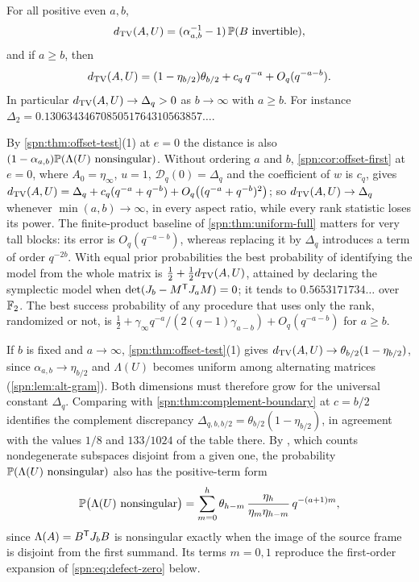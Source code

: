 \begin{theorem}\label{spn:thm:uniform-full}
For all positive even $a,b$,
\[
 d_{\mathrm{TV}}(A,U)=(\alpha_{a,b}^{-1}-1)\,\mathbb{P}(B\text{ invertible}),
\]
and if $a\ge b$, then
\[
 d_{\mathrm{TV}}(A,U)=(1-\eta_{b/2})\theta_{b/2}+c_q\,q^{-a}+O_q(q^{-a-b}).
\]
In particular $d_{\mathrm{TV}}(A,U)\to\Delta_q>0$ as $b\to\infty$ with $a\ge b$. For instance
$\Delta_2=0.1306343467085051764310563857\ldots$.
\end{theorem}

By \cref{spn:thm:offset-test}(1) at $e=0$ the distance is also
$(1-\alpha_{a,b})\mathbb{P}(\Lambda(U)\text{ nonsingular})$. Without ordering $a$ and $b$,
\cref{spn:cor:offset-first} at $e=0$, where $A_0=\eta_\infty$, $u=1$, $\mathcal D_q(0)=\Delta_q$ and
the coefficient of $w$ is $c_q$, gives
$d_{\mathrm{TV}}(A,U)=\Delta_q+c_q(q^{-a}+q^{-b})+O_q\bigl((q^{-a}+q^{-b})^2\bigr)$; so
$d_{\mathrm{TV}}(A,U)\to\Delta_q$ whenever $\min(a,b)\to\infty$, in every aspect ratio, while every rank
statistic loses its power. The finite-product baseline of \cref{spn:thm:uniform-full} matters for very tall blocks: its error is $O_q(q^{-a-b})$,
whereas replacing it by $\Delta_q$ introduces a term of order $q^{-2b}$. With equal prior
probabilities the best probability of identifying the model from the whole matrix is
$\frac12+\frac12d_{\mathrm{TV}}(A,U)$, attained by declaring the symplectic model when
$\det(J_b-M^{\mathsf{T}}J_aM)=0$; it tends to $0.5653171734\ldots$ over $\mathbb{F}_2$. The best success
probability of any procedure that uses only the rank, randomized or not, is
$\frac12+\gamma_\infty q^{-a}/(2(q-1)\gamma_{a-b})+O_q(q^{-a-b})$ for $a\ge b$.

\begin{remark}\label{spn:rem:fixed-source}
If $b$ is fixed and $a\to\infty$, \cref{spn:thm:offset-test}(1) gives
$d_{\mathrm{TV}}(A,U)\to\theta_{b/2}(1-\eta_{b/2})$, since
$\alpha_{a,b}\to\eta_{b/2}$ and $\Lambda(U)$ becomes uniform among alternating matrices
(\cref{spn:lem:alt-gram}). Both dimensions must therefore grow for the universal constant
$\Delta_q$. Comparing with \cref{spn:thm:complement-boundary} at $c=b/2$ identifies the complement
discrepancy $\Delta_{q,b,b/2}=\theta_{b/2}(1-\eta_{b/2})$, in agreement with the values $1/8$ and
$133/1024$ of the table there. By \cite[Theorem~4.9]{DeBoeckVandeVoorde2024Anzahl}, which counts
nondegenerate subspaces disjoint from a given one, the probability
$\mathbb{P}(\Lambda(U)\text{ nonsingular})$ also has the positive-term form
\[
 \mathbb{P}\bigl(\Lambda(U)\text{ nonsingular}\bigr)
 =\sum_{m=0}^{h}\theta_{h-m}\,\frac{\eta_h}{\eta_m\eta_{h-m}}\,q^{-(a+1)m},
\]
since $\Lambda(A)=B^{\mathsf{T}}J_bB$ is nonsingular exactly when the image of the source frame is
disjoint from the first summand. Its terms $m=0,1$ reproduce the first-order expansion of
\eqref{spn:eq:defect-zero} below.
\end{remark}

